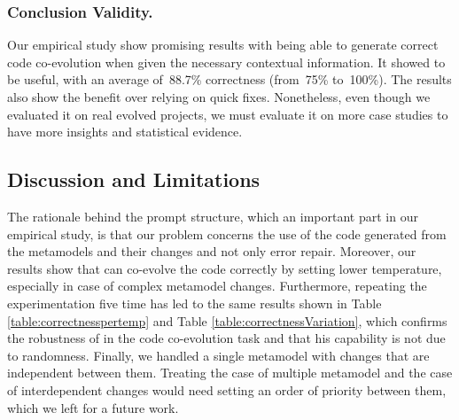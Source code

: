 \subsubsection{Conclusion Validity.}

Our empirical study show promising results with \LLM being able to generate correct code co-evolution when given the necessary contextual information. It showed to be useful, with an average of~88.7\% correctness (from~75\% to~100\%). The results also show the benefit over relying on quick fixes. Nonetheless, even though we evaluated it on real evolved projects, we must evaluate it on more case studies to have more insights and statistical evidence.  %

\subsection{Discussion and Limitations}
The rationale behind the prompt structure, which an important part in our empirical study, is that our problem concerns the use of the code generated from the metamodels and their changes and not only error repair. Moreover, our results show that \LLM can co-evolve the code correctly by setting lower temperature, especially in case of complex metamodel changes. Furthermore, repeating the experimentation five time has led to the same results shown in Table \ref{table:correctnesspertemp} and Table \ref{table:correctnessVariation}, which confirms the robustness of \LLM in the code co-evolution task and that his capability is not due to randomness.
Finally, we handled a single metamodel with changes that are independent between them. Treating the case of multiple metamodel and the case of interdependent changes would need setting an order of priority between them, which we left for a future work.



